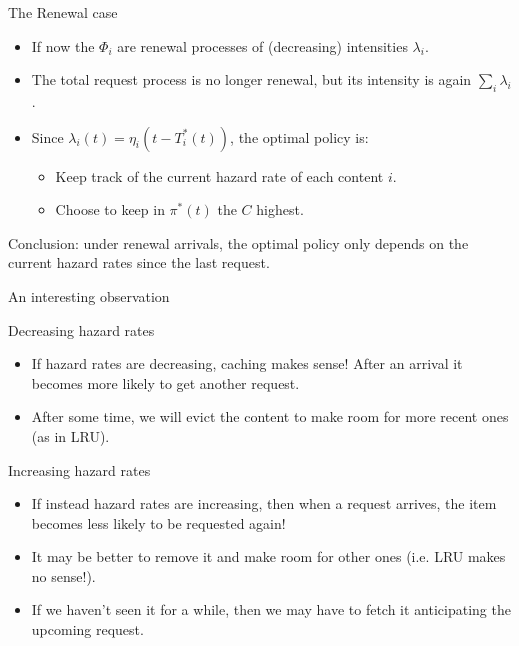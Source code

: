 \documentclass[aspectratio=169]{beamer}
\newenvironment*{myitem}[1][1.5em]{\begin{itemize}\setlength{\itemsep}{#1}}{\end{itemize}}
\begin{document}
\begin{frame}{The Renewal case}
	\begin{myitem}[2em]
		\item If now the $\Phi_i$ are renewal processes of (decreasing) intensities $\lambda_i$.
		\item The total request process is no longer renewal, but its intensity is again $\sum_i\lambda_i$.
		\item Since $\lambda_i(t) = \eta_i(t-T^*_i(t))$, the optimal policy is:
		\vspace{1em}
		\begin{itemize}
			\item Keep track of the \alert{current hazard rate} of each content $i$.
			\vspace{.5em}
			\item Choose to keep in $\pi^*(t)$ the $C$ highest. 
		\end{itemize}
	\end{myitem}

	\pause \vfill
	\alert{Conclusion:} under renewal arrivals, the optimal policy only depends on the current hazard rates since the last request.
\end{frame}

\begin{frame}{An interesting observation}

	\alert{Decreasing hazard rates}

	\begin{myitem}[1em]
		\item If hazard rates are \alert{decreasing}, caching makes sense! After an arrival it becomes more likely to get another request.
		\item After some time, we will evict the content to make room for more recent ones (as in LRU).
	\end{myitem}

	\pause\vfill
	\alert{Increasing hazard rates}

	\begin{myitem}[1em]
		\item If instead hazard rates are \alert{increasing}, then when a request arrives, the item becomes less likely to be requested again! 
		\item It may be better to remove it and make room for other ones (i.e. LRU makes no sense!).
		\item If we haven't seen it for a while, then we may have to fetch it \alert{anticipating} the upcoming request.
	\end{myitem}
\end{frame}
\end{document}
